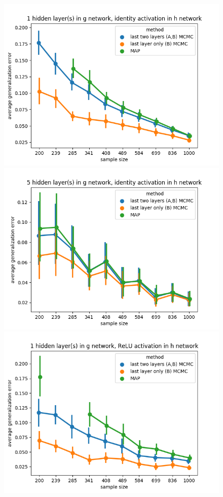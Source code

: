 \documentclass{article} %
\begin{document}
\newpage
\begin{figure}[t!]
	\begin{center}
		\includegraphics[scale=0.4]{taskid4.png}
		\includegraphics[scale=0.4]{taskid5.png}
		\includegraphics[scale=0.4]{taskid6.png}

\end{center}
\end{figure}
\end{document}
